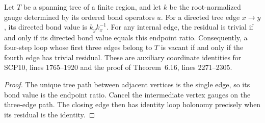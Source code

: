 \begin{lemma}
    \label{thm:peps_tree_gauge_transport}
    \leanok
    Let $T$ be a spanning tree of a finite region, and let $k$ be the
    root-normalized gauge determined by its ordered bond operators $u$.
    For a directed tree edge $x\to y$, its directed bond value is $k_y k_x^{-1}$.
    For any internal edge, the residual is trivial if and only if its directed
    bond value equals this endpoint ratio. Consequently, a four-step loop
    whose first three edges belong to $T$ is vacant if and only if the fourth
    edge has trivial residual.
    These are auxiliary coordinate identities for SCP10, lines 1765--1920
    and the proof of Theorem~6.16, lines 2271--2305.
\end{lemma}
\begin{proof}\leanok
    The unique tree path between adjacent vertices is the single edge, so its
    bond value is the endpoint ratio. Cancel the intermediate vertex gauges
    on the three-edge path. The closing edge then has identity loop holonomy
    precisely when its residual is the identity.
\end{proof}
